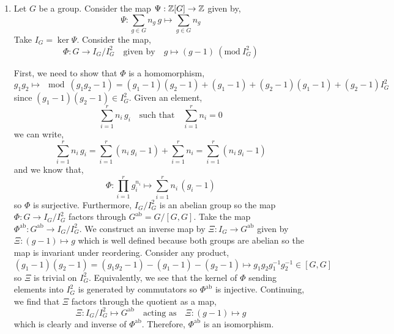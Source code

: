 \documentclass[12pt]{extarticle}
\begin{document}
 
\begin{enumerate}
\item Let $G$ be a group. Consider the map $\Psi : \mathbb{Z}[G] \to \mathbb{Z}$ given by,
\[ \Psi : \sum_{g \in G} n_g \, g \mapsto \sum_{g \in G} n_g \]
Take $I_G = \ker{\Psi}$. Consider the map,
\[ \Phi : G \to I_G / I_G^2 \quad \text{given by} \quad g \mapsto (g - 1) \: (\mathrm{mod} \: I_G^2) \]

First, we need to show that $\Phi$ is a homomorphism,
\[ g_1 g_2 \mapsto \mod{(g_1 g_2 - 1) = (g_1 - 1)(g_2 - 1) + (g_1 - 1) + (g_2 - 1)}{(g_1 - 1) + (g_2 - 1)}{I_G^2} \] 
since $(g_1 - 1) (g_2 - 1) \in I_G^2$. Given an element,
\[ \sum_{i = 1}^r n_i \, g_i  \quad \text{such that} \quad \sum_{i = 1}^r n_i = 0 \]
we can write,
\[ \sum_{i = 1}^r n_i \, g_i  = \sum_{i = 1}^r (n_i \, g_i - 1) + \sum_{i = 1}^r n_i = \sum_{i = 1}^r (n_i \, g_i - 1) \]
and we know that,
\[ \Phi : \prod_{i = 1}^r g_i^{n_i} \mapsto \sum_{i = 1}^r n_i \, (g_i - 1)  \] 
so $\Phi$ is surjective. Furthermore, $I_G/I_G^2$ is an abelian group so the map $\Phi : G \to I_G/I_G^2$ factors through $G^{\mathrm{ab}} = G/[G, G]$. Take the map $\Phi^{\mathrm{ab}} : G^{\mathrm{ab}} \to I_G/I_G^2$. We construct an inverse map by $\Xi : I_G \to G^{\mathrm{ab}}$ given by $\Xi : (g - 1) \mapsto g$ which is well defined because both groups are abelian so the map is invariant under reordering. Consider any product, 
\[(g_1 - 1)(g_2 - 1) = (g_1 g_2 - 1) - (g_1 - 1) - (g_2 - 1) \mapsto g_1 g_2 g_1^{-1} g_2^{-1} \in [G, G] \] 
so $\Xi$ is trivial on $I_G^2$. Equivalently, we see that the kernel of $\Phi$ sending elements into $I_G^2$ is generated by commutators so $\Phi^{\mathrm{ab}}$ is injective. Continuing, we find that $\Xi$ factors through the quotient as a map,
\[ \Xi : I_G / I_G^2 \mapsto G^{\mathrm{ab}} \quad \text{acting as} \quad \Xi : (g - 1) \mapsto g\] 
which is clearly and inverse of $\Phi^{\mathrm{ab}}$. Therefore, $\Phi^{\mathrm{ab}}$ is an isomorphism. 


\end{enumerate}
\end{document}
